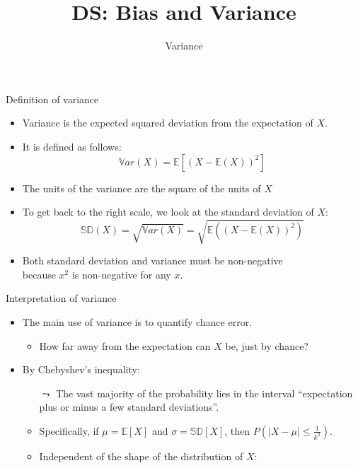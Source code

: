 \documentclass[aspectratio=169]{../latex_main/tntbeamer}  %
\title[Statistics]{DS: Bias and Variance}
\subtitle{Variance}
\begin{document}
	
	\maketitle
	\begin{frame}{Definition of variance}
	    \begin{itemize}
	        \item \alert{Variance} is the expected squared deviation from the expectation of $X$.
	        \item It is defined as follows:
	        \begin{equation*}
	            \mathbb{V}ar(X) = \mathbb{E}\left[(X - \mathbb{E}(X))^2\right]
	        \end{equation*}
	        \item The units of the variance are the square of the units of $X$
	        \item To get back to the right scale, we look at the \alert{standard deviation} of $X$:
	        \begin{equation*}
	            \mathbb{SD}(X)  = \sqrt{\mathbb{V}ar(X)}  =\sqrt{\mathbb{E}((X - \mathbb{E}(X))^2)}
	        \end{equation*}
	        \item Both standard deviation and variance must be non-negative\\ because $x^2$ is non-negative for any $x$.
	    \end{itemize}
	\end{frame}
	
	
	\begin{frame}[c]{Interpretation of variance}
	    \begin{itemize}
	        \item The main use of variance is to quantify chance error.
	        \begin{itemize}
	            \item How far away from the expectation can $X$ be, just by chance?
	        \end{itemize}
	        \item By Chebyshev’s inequality:
	        \begin{itemize}
	            \item[$\leadsto$] The vast majority of the probability lies in the interval “expectation plus or minus a few standard deviations”.
	            \item Specifically, if   $\mu  = \mathbb{E}[X]$ and    $\sigma   = \mathbb{SD}[X]$, then $P(|X - \mu| \leq \frac{1}{k^2})$.   
	            \item Independent of the shape of the distribution of $X$:\\
	        \end{itemize}
	    \end{itemize}
	\end{frame}
	
\end{document}
